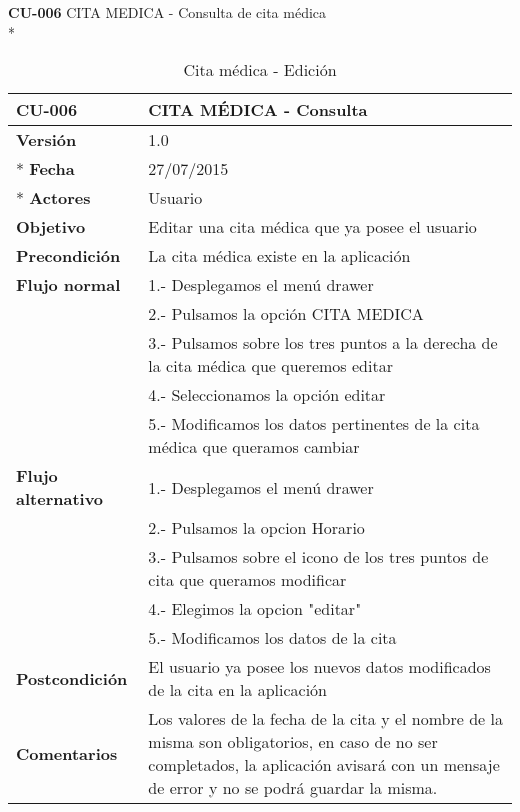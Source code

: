 \documentclass[../pfc.tex]{subfiles}
\begin{document}
	\textbf{CU-006}	CITA MEDICA - Consulta de cita médica\\*
	
		\begin{table}[H]
			\centering
			\begin{tabular}[t]{|p{3cm}|p{9.5cm}|}
				\hline \textbf{CU-006} & \textbf{CITA MÉDICA - Consulta} \\*
				\hline\hline \textbf{Versión} & 1.0 \\ *
				\hline\hline \textbf{Fecha} & 27/07/2015 \\ *
				\hline\textbf{Actores} 	& Usuario\\*
				\hline \textbf{Objetivo} & Editar una cita médica que ya posee el usuario\\* 			
				\hline \textbf{Precondición} & La cita médica existe en la aplicación\\* 
				\hline \textbf{Flujo normal} & 1.- Desplegamos el menú drawer \\* 
				& 2.- Pulsamos la opción CITA MEDICA\\*	
				& 3.- Pulsamos sobre los tres puntos a la derecha de la cita médica que queremos editar\\*	
				& 4.- Seleccionamos la opción editar\\*	
				& 5.- Modificamos los datos pertinentes de la cita médica que queramos cambiar\\*	
				\hline \textbf{Flujo alternativo} & 1.- Desplegamos el menú drawer \\* 
				& 2.- Pulsamos la opcion Horario \\*	
				& 3.- Pulsamos sobre el icono de los tres puntos de cita que queramos modificar \\*	
				& 4.- Elegimos la opcion "editar"\\*	
				& 5.- Modificamos los datos de la cita\\*	
				\hline \textbf{Postcondición} & El usuario ya posee los nuevos datos modificados de la cita en la aplicación \\* 
				\hline \textbf{Comentarios}   & Los valores de la fecha de la cita y el nombre de la misma son obligatorios, en caso de no ser completados, la aplicación avisará con un mensaje de error y no se podrá guardar la misma.\\*
				\hline
			\end{tabular}
			\caption{Cita médica - Edición}
			\label{tabla:caso006}
		\end{table}
		
	
	
\end{document}
